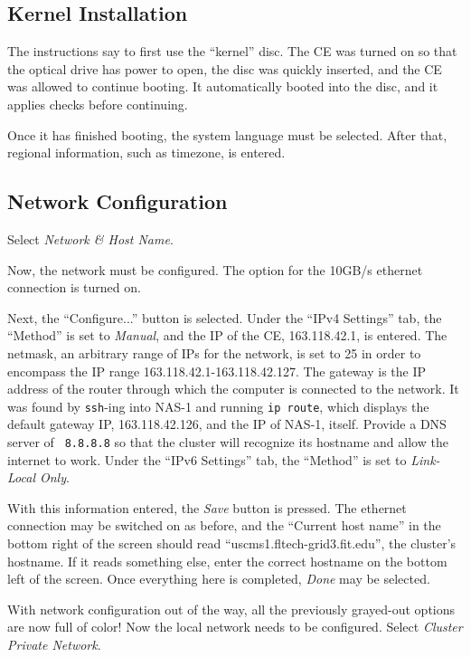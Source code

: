 \documentclass[12pt]{article}
\begin{document}
\subsection{Kernel Installation}

\qq The instructions say to first use the ``kernel'' disc. The CE was turned on
so that the optical drive has power to open, the disc was quickly inserted, and
the CE was allowed to continue booting. It automatically booted into the disc,
and it applies checks before continuing.

\qq Once it has finished booting, the system language must be selected. After
that, regional information, such as timezone, is entered.

\subsection{Network Configuration}

\qq Select \textit{Network \& Host Name}.

\qq Now, the network must be configured. The option for the 10GB/s ethernet
connection is turned on.

\qq Next, the ``Configure...'' button is selected. Under the ``IPv4 Settings''
tab, the ``Method'' is set to \textit{Manual}, and the IP of the CE,
163.118.42.1, is entered. The netmask, an arbitrary range of IPs for the
network, is set to 25 in order to encompass the IP range
163.118.42.1-163.118.42.127. The gateway is the IP address of the router through
which the computer is connected to the network. It was found by {\tt ssh}-ing
into NAS-1 and running {\tt ip route}, which displays the default gateway IP,
163.118.42.126, and the IP of NAS-1, itself. Provide a DNS server of {\tt
  8.8.8.8} so that the cluster will recognize its hostname and allow the
internet to work. Under the ``IPv6 Settings'' tab, the ``Method'' is set to
\textit{Link-Local Only}.

\qq With this information entered, the \textit{Save} button is pressed. The
ethernet connection may be switched on as before, and the ``Current host name''
in the bottom right of the screen should read ``uscms1.fltech-grid3.fit.edu'',
the cluster's hostname. If it reads something else, enter the correct hostname
on the bottom left of the screen. Once everything here is completed,
\textit{Done} may be selected.

\qq With network configuration out of the way, all the previously grayed-out
options are now full of color! Now the local network needs to be
configured. Select \textit{Cluster Private Network}.
\end{document}
